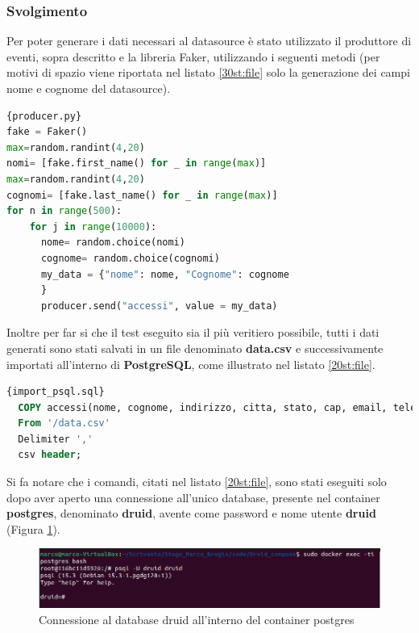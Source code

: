 \subsubsection{Svolgimento}
Per poter generare i dati necessari al \gls{datasource}{} è stato utilizzato il produttore di eventi, sopra descritto e la libreria \gls{Faker}{}, utilizzando i seguenti metodi (per motivi di spazio viene riportata nel listato \ref{30st:file} solo la generazione 
dei campi nome e cognome del \gls{datasource}{}).
\pagebreak
\begin{lstlisting}[language=Python, caption=\texttt{producer.py}, label=30st:file]{producer.py}
fake = Faker()
max=random.randint(4,20)  
nomi= [fake.first_name() for _ in range(max)]
max=random.randint(4,20)
cognomi= [fake.last_name() for _ in range(max)]
for n in range(500):
    for j in range(10000):
      nome= random.choice(nomi)
      cognome= random.choice(cognomi)
      my_data = {"nome": nome, "Cognome": cognome
      }
      producer.send("accessi", value = my_data) 
\end{lstlisting}
Inoltre per far si che il test eseguito sia il più veritiero possibile, tutti i dati generati 
sono stati salvati in un file denominato \textbf{data.csv} e successivamente importati all'interno di \textbf{PostgreSQL}, come illustrato nel listato \ref{20st:file}.
\begin{lstlisting}[language=SQL, caption=\texttt{import\_psql.sql}, label=20st:file]{import_psql.sql}
  COPY accessi(nome, cognome, indirizzo, citta, stato, cap, email, telefono, eta, altezza, peso, reddito, datan, professione, istruzione, hobby, nfigli, codice_cliente, datareg, __time)
  From '/data.csv'
  Delimiter ','
  csv header;
\end{lstlisting}
Si fa notare che i comandi, citati nel listato \ref{20st:file}, sono stati eseguiti solo dopo
aver aperto una connessione all'unico database, presente nel \gls{container}{} \textbf{postgres}, denominato \textbf{druid}, avente come password e nome utente \textbf{druid} (Figura \ref{fig:accesso_psql}).
\begin{figure}[h]
  \centering
  \includegraphics[width=1\textwidth]{images/percorso/accesso_psql.png}
  \caption{Connessione al database druid all'interno del container postgres}
  \label{fig:accesso_psql}
\end{figure}
